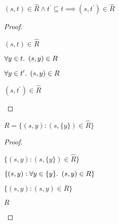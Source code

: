\begin{prop}\label{prop:rel-hat-subset}
  $(s,t)\in\widehat{R}\land t^\prime\subseteq t\implies (s,t^\prime)\in\widehat{R}$
  \begin{proof}~\\
    \begin{itemize}
      \step
        $(s,t)\in\widehat{R}$
        \marginnote{\Hyp}

      \step[\iffs]
        $\forall y\in t\ldotp~(s,y)\in R$
        \marginnote{\Def-~$\widehat{\cdot}$}

      \step[\imps]
        $\forall y\in t^\prime\ldotp~(s,y)\in R$

      \step[\iffs]
        $(s, t^\prime)\in\widehat{R}$
        \qedhere
        \marginnote{\Def-~$\widehat{\cdot}$}
    \end{itemize}
  \end{proof}
\end{prop}

\begin{prop}\label{prop:rel-rel-hat}
  $R = \{(s,y) : (s,\{y\})\in\widehat{R}\}$
  \begin{proof}~\\
    \begin{itemize}
      \step $\{(s,y):(s,\{y\})\in\widehat{R}\}$

      \step[=] $\{(s,y):\forall y\in\{y\}\ldotp~(s,y)\in R\}$

      \step[=] $\{(s,y):(s,y)\in R\}$

      \step[=] $R$\qedhere
    \end{itemize}
  \end{proof}
\end{prop}

